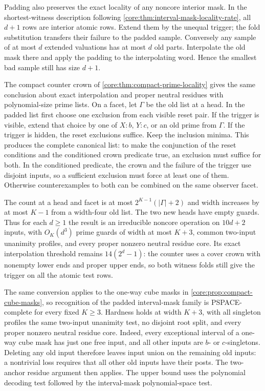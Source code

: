 Padding also preserves the exact locality of any
noncore interior mask. In the shortest-witness
description following \cref{core:thm:interval-mask-locality-rate},
all $d+1$ rows are interior atomic rows. Extend
them by the unequal trigger; the fold substitution
transfers their failure to the padded sample.
Conversely any sample of at most $d$ extended
valuations has at most $d$ old parts. Interpolate
the old mask there and apply the padding to the
interpolating word. Hence the smallest bad sample
still has size $d+1$.

The compact counter crown of
\cref{core:thm:compact-prime-locality} gives the same
conclusion about exact interpolation and proper
neutral residues with polynomial-size prime lists.
On a facet, let $\Gamma$ be the old list at a head.
In the padded list first choose one exclusion from
each visible reset pair. If the trigger is visible,
extend that choice by one of $X:b$, $Y:c$, or an
old prime from $\Gamma$. If the trigger is hidden,
the reset exclusions suffice. Keep the inclusion
minima. This produces the complete canonical list:
to make the conjunction of the reset conditions
and the conditioned crown predicate true, an
exclusion must suffice for both. In the conditioned
predicate, the crown and the failure of the trigger
use disjoint inputs, so a sufficient exclusion must
force at least one of them. Otherwise counterexamples
to both can be combined on the same observer facet.

The count at a head and facet is at most
$2^{K-1}(|\Gamma|+2)$ and width increases by at
most $K-1$ from a width-four old list. The two new
heads have empty guards. Thus for each $d\ge1$ the
result is an irreducible noncore operation on
$10d+2$ inputs, with $O_K(d^3)$ prime guards of width
at most $K+3$, common two-input unanimity profiles,
and every proper nonzero neutral residue core. Its
exact interpolation threshold remains $14(2^d-1)$:
the counter uses a cover crown with nonempty lower
ends and proper upper ends, so both witness folds
still give the trigger on all the atomic test rows.

The same conversion applies to the one-way cube
masks in \cref{core:prop:compact-cube-masks}, so
recognition of the padded interval-mask family is
PSPACE-complete for every fixed $K\ge3$. Hardness
holds at width $K+3$, with all singleton profiles
the same two-input unanimity test, no disjoint
root split, and every proper nonzero neutral
residue core. Indeed, every exceptional interval
of a one-way cube mask has just one free input,
and all other inputs are $b$- or $c$-singletons.
Deleting any old input therefore leaves input
union on the remaining old inputs: a nontrivial
loss requires that all other old inputs have their
posts. The two-anchor residue argument then
applies. The upper bound uses the polynomial
decoding test followed by the interval-mask
polynomial-space test.

